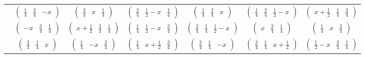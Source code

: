 \documentclass[fleqn,9pt,landscape]{jsarticle}
\begin{document}
\begin{center}
\begin{longtable}{ccccccc}
& $ \begin{pmatrix} \frac{1}{4} & \frac{3}{4} & - x \end{pmatrix} $ & $ \begin{pmatrix} \frac{3}{4} & x & \frac{1}{4} \end{pmatrix} $ & $ \begin{pmatrix} \frac{3}{4} & \frac{1}{2} - x & \frac{1}{4} \end{pmatrix} $ & $ \begin{pmatrix} \frac{1}{4} & \frac{3}{4} & x \end{pmatrix} $ & $ \begin{pmatrix} \frac{1}{4} & \frac{3}{4} & \frac{1}{2} - x \end{pmatrix} $ & $ \begin{pmatrix} x + \frac{1}{2} & \frac{1}{4} & \frac{3}{4} \end{pmatrix} $ \\
& $ \begin{pmatrix} - x & \frac{3}{4} & \frac{1}{4} \end{pmatrix} $ & $ \begin{pmatrix} x + \frac{1}{2} & \frac{3}{4} & \frac{1}{4} \end{pmatrix} $ & $ \begin{pmatrix} \frac{1}{4} & \frac{1}{2} - x & \frac{3}{4} \end{pmatrix} $ & $ \begin{pmatrix} \frac{3}{4} & \frac{1}{4} & \frac{1}{2} - x \end{pmatrix} $ & $ \begin{pmatrix} x & \frac{3}{4} & \frac{1}{4} \end{pmatrix} $ & $ \begin{pmatrix} \frac{1}{4} & x & \frac{3}{4} \end{pmatrix} $ \\
& $ \begin{pmatrix} \frac{3}{4} & \frac{1}{4} & x \end{pmatrix} $ & $ \begin{pmatrix} \frac{1}{4} & - x & \frac{3}{4} \end{pmatrix} $ & $ \begin{pmatrix} \frac{1}{4} & x + \frac{1}{2} & \frac{3}{4} \end{pmatrix} $ & $ \begin{pmatrix} \frac{3}{4} & \frac{1}{4} & - x \end{pmatrix} $ & $ \begin{pmatrix} \frac{3}{4} & \frac{1}{4} & x + \frac{1}{2} \end{pmatrix} $ & $ \begin{pmatrix} \frac{1}{2} - x & \frac{3}{4} & \frac{1}{4} \end{pmatrix} $ \\ \hline

\end{longtable}
\end{center}
\end{document}
